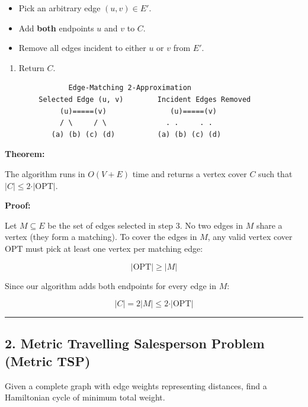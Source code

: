 \documentclass[
]{book}
\providecommand{\tightlist}{%
  \setlength{\itemsep}{0pt}\setlength{\parskip}{0pt}}
\theoremstyle{definition}
\theoremstyle{definition}
\theoremstyle{definition}
\theoremstyle{definition}
\theoremstyle{remark}
\begin{document}
\begin{itemize}
\tightlist
\item
  Pick an arbitrary edge \((u, v) \in E'\).
\item
  Add \textbf{both} endpoints \(u\) and \(v\) to \(C\).
\item
  Remove all edges incident to either \(u\) or \(v\) from \(E'\).
\end{itemize}

\begin{enumerate}
\def\labelenumi{\arabic{enumi}.}
\setcounter{enumi}{3}
\tightlist
\item
  Return \(C\).
\end{enumerate}

\begin{verbatim}
               Edge-Matching 2-Approximation
        Selected Edge (u, v)        Incident Edges Removed
             (u)=====(v)               (u)=====(v)
             / \     / \              . .     . .
           (a) (b) (c) (d)          (a) (b) (c) (d)
\end{verbatim}

\textbf{Theorem:}

The algorithm runs in \(O(V + E)\) time and returns a vertex cover \(C\) such that \(\vert{}C\vert{} \le 2 \cdot \vert{}\text{OPT}\vert{}\).

\textbf{Proof:}

Let \(M \subseteq E\) be the set of edges selected in step 3. No two edges in \(M\) share a vertex (they form a matching). To cover the edges in \(M\), any valid vertex cover \(\text{OPT}\) must pick at least one vertex per matching edge:

\[\vert{}\text{OPT}\vert{} \ge \vert{}M\vert{}\]

Since our algorithm adds both endpoints for every edge in \(M\):

\[\vert{}C\vert{} = 2\vert{}M\vert{} \le 2 \cdot \vert{}\text{OPT}\vert{}\]

\begin{center}\rule{0.5\linewidth}{0.5pt}\end{center}

\subsection{2. Metric Travelling Salesperson Problem (Metric TSP)}\label{metric-travelling-salesperson-problem-metric-tsp}

Given a complete graph with edge weights representing distances, find a Hamiltonian cycle of minimum total weight.
\end{document}
